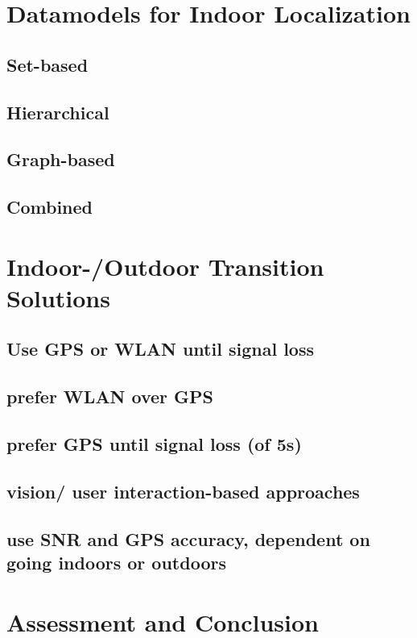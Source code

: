 \section{Datamodels for Indoor Localization}

\subsection*{Set-based}
	
\subsection*{Hierarchical} 
	
\subsection*{Graph-based} 
	
\subsection*{Combined}

\section{Indoor-/Outdoor Transition Solutions}
\subsection*{Use GPS or WLAN until signal loss}
	
\subsection*{prefer WLAN over GPS}	
\subsection*{prefer GPS until signal loss (of 5s)}
	
\subsection*{vision/ user interaction-based approaches}
	
\subsection*{use SNR and GPS accuracy, dependent on going indoors or outdoors}

\section{Assessment and Conclusion}
